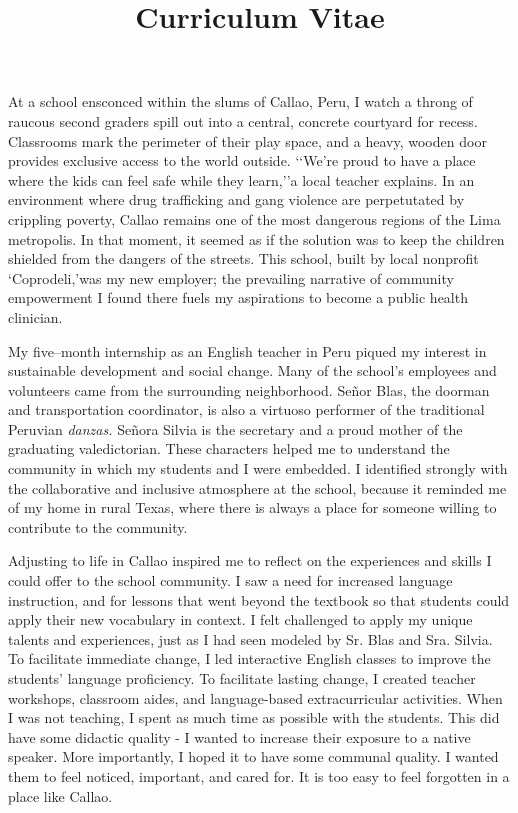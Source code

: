\documentclass[12pt,a4paper,roman]{moderncv} %
\title{Curriculum Vitae}
\begin{document}


\clearpage


At a school ensconced within the slums of Callao, Peru, I watch a throng of raucous second graders spill out into a central, concrete courtyard for recess. Classrooms mark the perimeter of their play space, and a heavy, wooden door provides exclusive access to the world outside. \lq\lq We're proud to have a place where the kids can feel safe while they learn,\rq\rq\space a local teacher explains. In an environment where drug trafficking and gang violence are perpetutated by crippling poverty, Callao remains one of the most dangerous regions of the Lima metropolis. In that moment, it seemed as if the solution was to keep the children shielded from the dangers of the streets. This school, built by local nonprofit  \lq Coprodeli,\rq\space was my new employer; the prevailing narrative of community empowerment I found there fuels my aspirations to become a public health clinician.

\medskip
 
My five--month internship as an English teacher in Peru piqued my interest in sustainable development and social change. Many of the school's employees and volunteers came from the surrounding neighborhood. Se\~nor Blas, the doorman and transportation coordinator, is also a virtuoso performer of the traditional Peruvian \textit{danzas.} Se\~nora Silvia is the secretary and a proud mother of the graduating valedictorian.  These characters helped me to understand the community in which my students and I were embedded. I identified strongly with the collaborative and inclusive atmosphere at the school, because it reminded me of my home in rural Texas, where there is always a place for someone willing to contribute to the community.

\medskip

Adjusting to life in Callao inspired me to reflect on the experiences and skills I could offer to the school community. I saw a need for increased language instruction, and for lessons that went beyond the textbook so that students could apply their new vocabulary in context. I felt challenged to apply my unique talents and experiences, just as I had seen modeled by Sr. Blas and Sra. Silvia. To facilitate immediate change, I led interactive English classes to improve the students' language proficiency. To facilitate lasting change, I created teacher workshops, classroom aides, and language-based extracurricular activities.  When I was not teaching, I spent as much time as possible with the students. This did have some didactic quality - I wanted to increase their exposure to a native speaker. More importantly, I hoped it to have some communal quality. I wanted them to feel noticed, important, and cared for. It is too easy to feel forgotten in a place like Callao.
\end{document}
